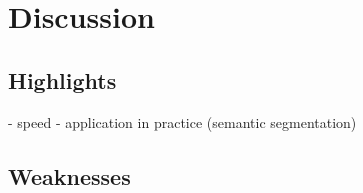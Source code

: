 \section{Discussion}

\subsection{Highlights}
- speed
- application in practice (semantic segmentation)

\subsection{Weaknesses}
